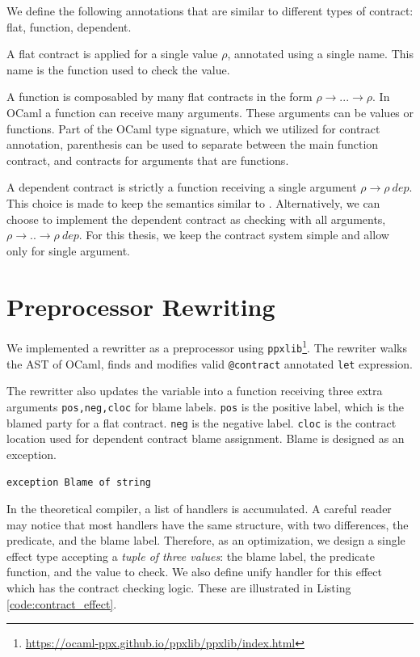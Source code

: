 We define the following annotations that are similar to different types of
contract: flat, function, dependent.

A flat contract is applied for a single value $\rho$, annotated using a single
name. This name is the function used to check the value.

A function is composabled by many flat contracts in the form $\rho \rightarrow
... \rightarrow \rho$. In OCaml a function can receive many arguments. These
arguments can be values or functions. Part of the OCaml type signature, which
we utilized for contract annotation, parenthesis can be used to separate
between the main function contract, and contracts for arguments that are
functions.

A dependent contract is strictly a function receiving a single argument $\rho
\rightarrow \rho\ dep$. This choice is made to keep the semantics similar to
\langc. Alternatively, we can choose to implement the dependent contract as
checking with all arguments, $\rho \rightarrow .. \rightarrow \rho\ dep$. For
this thesis, we keep the contract system simple and allow only for single
argument.

\section{Preprocessor Rewriting}

We implemented a rewritter as a preprocessor using
\texttt{ppxlib}\footnote{\href{https://ocaml-ppx.github.io/ppxlib/ppxlib/index.html}{https://ocaml-ppx.github.io/ppxlib/ppxlib/index.html}}.
The rewriter walks the AST of OCaml, finds and modifies valid
\texttt{@contract} annotated \texttt{let} expression.

The rewritter also updates the variable into a function receiving three extra
arguments \texttt{pos,neg,cloc} for blame labels. \texttt{pos} is the positive
label, which is the blamed party for a flat contract. \texttt{neg} is the
negative label. \texttt{cloc} is the contract location used for dependent
contract blame assignment. Blame is designed as an exception.

\begin{listing}
\begin{verbatim}
exception Blame of string
\end{verbatim}
\caption{Blame exception}
\label{code:blame_exception}
\end{listing}

In the theoretical compiler, a list of handlers is accumulated. A careful
reader may notice that most handlers have the same structure, with two
differences, the predicate, and the blame label. Therefore, as an optimization,
we design a single effect type accepting a \textit{tuple of three values}: the
blame label, the predicate function, and the value to check. We also define
unify handler for this effect which has the contract checking logic. These are
illustrated in Listing \ref{code:contract_effect}.

